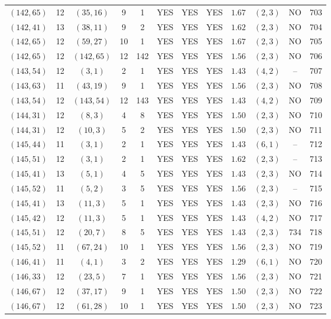 \begin{longtable}{|c|c|c|c|c|c|c|c|c|c|c|c|}
$(142,65)$ & 12 & $(35,16)$ & 9 & 1 & YES & YES & YES & $1.67$ & $(2,3)$ & NO & 703\\
$(142,41)$ & 13 & $(38,11)$ & 9 & 2 & YES & YES & YES & $1.62$ & $(2,3)$ & NO & 704\\
$(142,65)$ & 12 & $(59,27)$ & 10 & 1 & YES & YES & YES & $1.67$ & $(2,3)$ & NO & 705\\
$(142,65)$ & 12 & $(142,65)$ & 12 & 142 & YES & YES & YES & $1.56$ & $(2,3)$ & NO & 706\\
$(143,54)$ & 12 & $(3,1)$ & 2 & 1 & YES & YES & YES & $1.43$ & $(4,2)$ & -- & 707\\
$(143,63)$ & 11 & $(43,19)$ & 9 & 1 & YES & YES & YES & $1.56$ & $(2,3)$ & NO & 708\\
$(143,54)$ & 12 & $(143,54)$ & 12 & 143 & YES & YES & YES & $1.43$ & $(4,2)$ & NO & 709\\
$(144,31)$ & 12 & $(8,3)$ & 4 & 8 & YES & YES & YES & $1.50$ & $(2,3)$ & NO & 710\\
$(144,31)$ & 12 & $(10,3)$ & 5 & 2 & YES & YES & YES & $1.50$ & $(2,3)$ & NO & 711\\
$(145,44)$ & 11 & $(3,1)$ & 2 & 1 & YES & YES & YES & $1.43$ & $(6,1)$ & -- & 712\\
$(145,51)$ & 12 & $(3,1)$ & 2 & 1 & YES & YES & YES & $1.62$ & $(2,3)$ & -- & 713\\
$(145,41)$ & 13 & $(5,1)$ & 4 & 5 & YES & YES & YES & $1.43$ & $(2,3)$ & NO & 714\\
$(145,52)$ & 11 & $(5,2)$ & 3 & 5 & YES & YES & YES & $1.56$ & $(2,3)$ & -- & 715\\
$(145,41)$ & 13 & $(11,3)$ & 5 & 1 & YES & YES & YES & $1.43$ & $(2,3)$ & NO & 716\\
$(145,42)$ & 12 & $(11,3)$ & 5 & 1 & YES & YES & YES & $1.43$ & $(4,2)$ & NO & 717\\
$(145,51)$ & 12 & $(20,7)$ & 8 & 5 & YES & YES & YES & $1.43$ & $(2,3)$ & 734 & 718\\
$(145,52)$ & 11 & $(67,24)$ & 10 & 1 & YES & YES & YES & $1.56$ & $(2,3)$ & NO & 719\\
$(146,41)$ & 11 & $(4,1)$ & 3 & 2 & YES & YES & YES & $1.29$ & $(6,1)$ & NO & 720\\
$(146,33)$ & 12 & $(23,5)$ & 7 & 1 & YES & YES & YES & $1.56$ & $(2,3)$ & NO & 721\\
$(146,67)$ & 12 & $(37,17)$ & 9 & 1 & YES & YES & YES & $1.50$ & $(2,3)$ & NO & 722\\
$(146,67)$ & 12 & $(61,28)$ & 10 & 1 & YES & YES & YES & $1.50$ & $(2,3)$ & NO & 723\\

\end{longtable}
